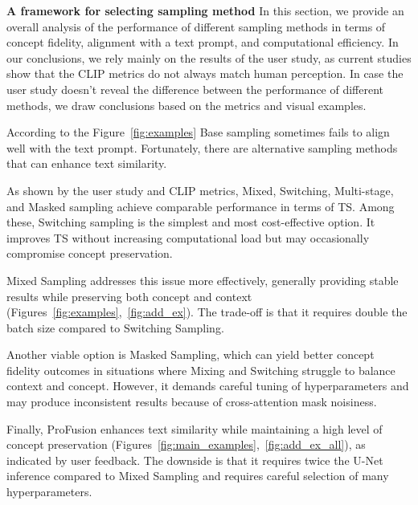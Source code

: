 \textbf{A framework for selecting sampling method}
In this section, we provide an overall analysis of the performance of different sampling methods in terms of concept fidelity, alignment with a text prompt, and computational efficiency. In our conclusions, we rely mainly on the results of the user study, as current studies show that the CLIP metrics do not always match human perception. In case the user study doesn't reveal the difference between the performance of different methods, we draw conclusions based on the metrics and visual examples.

According to the Figure~\ref{fig:examples} Base sampling sometimes fails to align well with the text prompt. Fortunately, there are alternative sampling methods that can enhance text similarity. 


As shown by the user study and CLIP metrics, Mixed, Switching, Multi-stage, and Masked sampling achieve comparable performance in terms of TS. Among these, Switching sampling is the simplest and most cost-effective option. It improves TS without increasing computational load but may occasionally compromise concept preservation.

Mixed Sampling addresses this issue more effectively, generally providing stable results while preserving both concept and context (Figures~\ref{fig:examples},~\ref{fig:add_ex}). The trade-off is that it requires double the batch size compared to Switching Sampling. 

Another viable option is Masked Sampling, which can yield better concept fidelity outcomes in situations where Mixing and Switching struggle to balance context and concept. However, it demands careful tuning of hyperparameters and may produce inconsistent results because of cross-attention mask noisiness.

Finally, ProFusion enhances text similarity while maintaining a high level of concept preservation (Figures~\ref{fig:main_examples},~\ref{fig:add_ex_all}), as indicated by user feedback. The downside is that it requires twice the U-Net inference compared to Mixed Sampling and requires careful selection of many hyperparameters.
